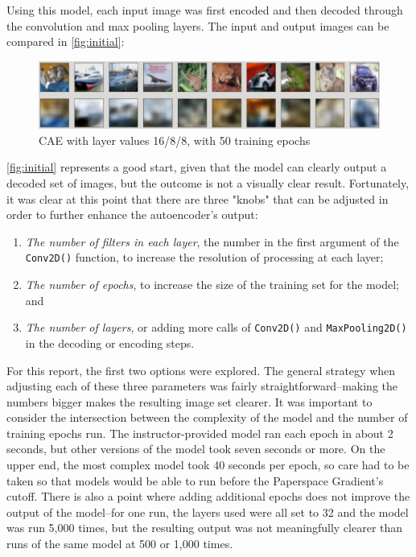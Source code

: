\documentclass{article}
\begin{document}
\par Using this model, each input image was first encoded and then decoded through the convolution and max pooling layers.
The input and output images can be compared in \autoref{fig:initial}:

\begin{figure}[H]
    \centering
    \includegraphics[width=4.75in]{csci-8110/hw-1/hw1-images/16-8-8-50.png}
    \caption{CAE with layer values 16/8/8, with 50 training epochs}
    \label{fig:initial}
\end{figure}

\par \autoref{fig:initial} represents a good start, given that the model can clearly output a decoded set of images, but the outcome is not a visually clear result. 
Fortunately, it was clear at this point that there are three "knobs" that can be adjusted in order to further enhance the autoencoder's output:
\begin{enumerate}
  \item \textit{The number of filters in each layer}, the number in the first argument of the \lstinline[language=Python]{Conv2D()} function, to increase the resolution  of processing at each layer;
  \item \textit{The number of epochs}, to increase the size of the training set for the model; and
  \item \textit{The number of layers}, or adding more calls of \lstinline[language=Python]{Conv2D()} and \lstinline[language=Python]{MaxPooling2D()} in the decoding or encoding steps.
\end{enumerate}

\par For this report, the first two options were explored. 
The general strategy when adjusting each of these three parameters was fairly straightforward--making the numbers bigger makes the resulting image set clearer.
It was important to consider the intersection between the complexity of the model and the number of training epochs run.
The instructor-provided model ran each epoch in about 2 seconds, but other versions of the model took seven seconds or more. On the upper end, the most complex model took 40 seconds per epoch, so care had to be taken so that models would be able to run before the Paperspace Gradient's cutoff.
There is also a point where adding additional epochs does not improve the output of the model--for one run, the layers used were all set to 32 and the model was run 5,000 times, but the resulting output was not meaningfully clearer than runs of the same model at 500 or 1,000 times.
\end{document}
